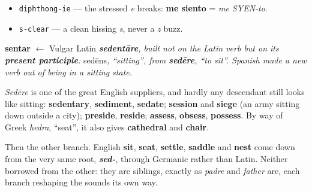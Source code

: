 \begin{sounds}
\begin{itemize}
\raggedright
  \item \texttt{diphthong-ie} — the stressed \emph{e} breaks: \textbf{me siento} = \emph{me SYEN-to}.
  \item \texttt{s-clear} — a clean hissing \emph{s}, never a \emph{z} buzz.
\end{itemize}
\end{sounds}

\begin{cousinweb}
\textbf{sentar} $\leftarrow$ Vulgar Latin \emph{\textbf{sedentāre}, built not on the Latin verb but on its \textbf{present participle}: }sedēns\emph{, \textquotedblleft{}sitting\textquotedblright{}, from \textbf{sedēre}, \textquotedblleft{}to sit\textquotedblright{}. Spanish made a new verb out of being in a sitting state.}

\emph{Sedēre} is one of the great English suppliers, and hardly any descendant still looks like sitting: \textbf{sedentary}, \textbf{sediment}, \textbf{sedate}; \textbf{session} and \textbf{siege} (an army sitting down outside a city); \textbf{preside}, \textbf{reside}; \textbf{assess}, \textbf{obsess}, \textbf{possess}. By way of Greek \emph{hedra}, \textquotedblleft{}seat\textquotedblright{}, it also gives \textbf{cathedral} and \textbf{chair}.

Then the other branch. English \textbf{sit}, \textbf{seat}, \textbf{settle}, \textbf{saddle} and \textbf{nest} come down from the very same root, \emph{\textbf{sed-}}, through Germanic rather than Latin. Neither borrowed from the other: they are siblings, exactly as \emph{padre} and \emph{father} are, each branch reshaping the sounds its own way.
\end{cousinweb}


